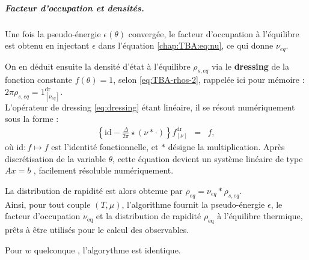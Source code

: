 \medskip
\subparagraph{Facteur d’occupation et densités.}  
Une fois la pseudo-énergie \( \epsilon(\theta) \) convergée, le facteur d’occupation  à l'équilibre est obtenu en injectant $\epsilon$ dans l’équation \eqref{chap:TBA:eq:nu}, ce qui donne  $\nu_{\!eq}$.
 
On en déduit ensuite la densité d'état à l'équilibre $\rho_{s,eq}$ via le {\bf dressing}  de la fonction constante $f(\theta) = 1$, selon \eqref{eq:TBA-rhos-2}, rappelée ici pour mémoire : $ 2\pi \rho_{s,eq}  =  1^{\mathrm{dr}}_{[\nu_{\! eq}]}$.\\

L’opérateur de dressing \eqref{eq:dressing} étant linéaire, il se résout numériquement sous la forme :
\begin{eqnarray*}
	\left\{ \mathrm{id} - \frac{\Delta}{2\pi} \star ( \nu \ast \cdot ) \right\} f^{\mathrm{dr}}_{[\nu]} & = & f,\label{eq:TBA:rho_s:num}
\end{eqnarray*}
où $\mathrm{id} \colon f \mapsto f$ est l’identité fonctionnelle, et $\ast$ désigne la multiplication.
Après discrétisation de la variable $\theta$, cette équation devient un système linéaire de type $Ax=b$ , facilement résoluble numériquement.

La distribution de rapidité est alors obtenue par $\rho_{\!eq} = \nu_{\!eq} \ast \rho_{\! s,eq}$.\\

\medskip
Ainsi, pour tout couple \((T,\mu)\), l’algorithme fournit la pseudo-énergie \( \epsilon \), le facteur d’occupation \( \nu_{\mathrm{eq}} \) et la distribution de rapidité \( \rho_{\mathrm{eq}} \) à l’équilibre thermique, prêts à être utilisés pour le calcul des observables.

\medskip
Pour $w$ quelconque , l'algorythme est identique.




		

